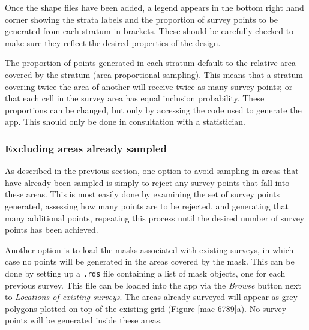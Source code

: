 \documentclass[a4paper,11pt, draft]{article} %
\begin{document}
Once the shape files have been added, a legend appears in the bottom right hand corner showing the strata labels and the proportion of survey points to be generated from each stratum in brackets. These should be carefully checked to make sure they reflect the desired properties of the design. 

The proportion of points generated in each stratum default to the relative area covered by the stratum (area-proportional sampling). This means that a stratum covering twice the area of another will receive twice as many survey points; or that each cell in the survey area has equal inclusion probability. These proportions can be changed, but only by accessing the code used to generate the app. This should only be done in consultation with a statistician.

\subsubsection{Excluding areas already sampled}
As described in the previous section, one option to avoid sampling in areas that have already been sampled is simply to reject any survey points that fall into these areas. This is most easily done by examining the set of survey points generated, assessing how many points are to be rejected, and generating that many additional points, repeating this process until the desired number of survey points has been achieved. 

Another option is to load the masks associated with existing surveys, in which case no points will be generated in the areas covered by the mask. This can be done by setting up a \texttt{.rds} file containing a list of mask objects, one for each previous survey. This file can be loaded into the app via the \textit{Browse} button next to \textit{Locations of existing surveys}. The areas already surveyed will appear as grey polygons plotted on top of the existing grid (Figure \ref{mac-6789}a). No survey points will be generated inside these areas. 
\end{document}
